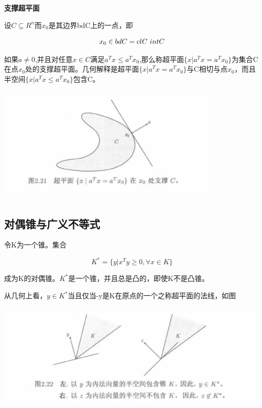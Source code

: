 \documentclass{ctexart}
\begin{document}
	\textbf{支撑超平面}
	
	设\(C \subseteq R^n\)而\(x_0\)是其边界bdC上的一点，即
	
	\[x_0 \in bdC = clC \\\ intC\]
	
	如果\(a \neq 0\),并且对任意\(x \in C\)满足\(a^Tx \leq a^Tx_0\),那么称超平面\(\{x|a^Tx = a^Tx_0\}\)为集合C在点\(x_0\)处的支撑超平面。几何解释是超平面\(\{x|a^Tx = a^Tx_0\}\)与C相切与点\(x_0\)，而且半空间\(\{x|a^Tx \leq a^Tx_0\}\)包含C。
	
	\includegraphics[width=1\linewidth]{pic/pic2_21}
	
	\subsection{对偶锥与广义不等式}
	
	令K为一个锥。集合
	
	\[K^*=\{y|x^Ty \geq 0 , \forall x \in K\}\]
	
	成为K的对偶锥。\(K^*\)是一个锥，并且总是凸的，即使K不是凸锥。
	
	从几何上看，\(y \in K^*\)当且仅当-y是K在原点的一个之称超平面的法线，如图
	
	\includegraphics[width=1\linewidth]{pic/pic2_22}
	
	
	
	
	
	
	
	
\end{document}
